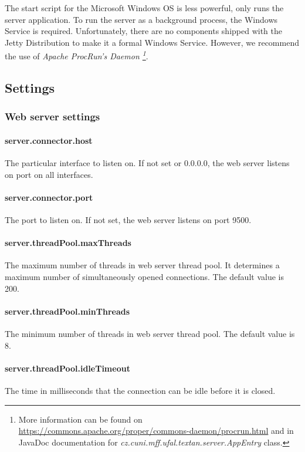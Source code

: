 \documentclass[12pt,a4paper]{report}
\begin{document}
The start script for the Microsoft Windows OS is less powerful, only runs the server application. 
To run the server as a background process, the Windows Service is required. 
Unfortunately, there are no components shipped with the Jetty Distribution to make it a formal Windows Service.
However, we recommend the use of \emph{Apache ProcRun's Daemon
\footnote{More information can be found on \url{https://commons.apache.org/proper/commons-daemon/procrun.html} and in JavaDoc documentation for \emph{cz.cuni.mff.ufal.textan.server.AppEntry} class.}}.

\subsection{Settings}
\label{sec:ServerSettings}

\subsubsection{Web server settings}

\paragraph{server.connector.host} The particular interface to listen on. If not set or 0.0.0.0, the web server listens on port on all interfaces.

\paragraph{server.connector.port} The port to listen on. If not set, the web server listens on port 9500.

\paragraph{server.threadPool.maxThreads} The maximum number of threads in web server thread pool. It determines a maximum number of simultaneously opened connections. The default value is 200.

\paragraph{server.threadPool.minThreads} The minimum number of threads in web server thread pool. The default value is 8.

\paragraph{server.threadPool.idleTimeout} The time in milliseconds that the connection can be idle before it is closed.
\end{document}

